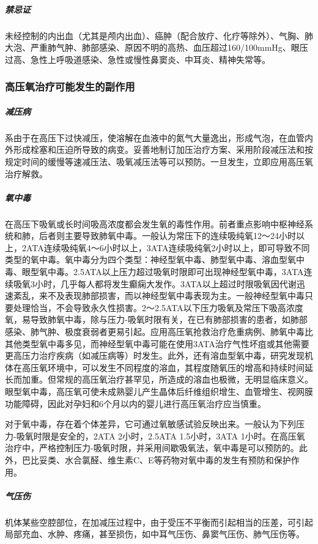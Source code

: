 \subparagraph{禁忌证}

未经控制的内出血（尤其是颅内出血）、癌肿（配合放疗、化疗等除外）、气胸、肺大泡、严重肺气肿、肺部感染、原因不明的高热、血压超过160/100mmHg、眼压过高、急性上呼吸道感染、急性或慢性鼻窦炎、中耳炎、精神失常等。

\subsubsection{高压氧治疗可能发生的副作用}

\subparagraph{减压病}

系由于在高压下过快减压，使溶解在血液中的氮气大量逸出，形成气泡，在血管内外形成栓塞和压迫所导致的病变。妥善地制订加压治疗方案、采用阶段减压法和按规定时间的缓慢等速减压法、吸氧减压法等可以预防。一旦发生，立即应用高压氧治疗解救。

\subparagraph{氧中毒}

在高压下吸氧或长时间吸高浓度都会发生氧的毒性作用。前者重点影响中枢神经系统和肺，后者则主要导致肺氧中毒。一般认为常压下的连续吸纯氧12～24小时以上，2ATA连续吸纯氧4～6小时以上，3ATA连续吸纯氧2小时以上，即可导致不同类型的氧中毒。氧中毒分为四个类型：神经型氧中毒、肺型氧中毒、溶血型氧中毒、眼型氧中毒。2.5ATA以上压力超过吸氧时限即可出现神经型氧中毒，3ATA连续吸氧3小时，几乎每人都将发生癫痫大发作。3ATA以上超过时限吸氧因代谢迅速紊乱，来不及表现肺部损害，而以神经型氧中毒表现为主。一般神经型氧中毒只要处理恰当，不会导致永久性损害。2～2.5ATA以下压力吸氧及常压下吸高浓度氧，易导致肺氧中毒，除与压力-吸氧时限有关，在已有肺部损害的患者，如肺部感染、肺气肿、极度衰弱者更易引起。应用高压氧抢救治疗危重病例、肺氧中毒比其他类型氧中毒多见，而神经型氧中毒可能在使用3ATA治疗气性坏疽或其他需要更高压力治疗疾病（如减压病等）时发生。此外，还有溶血型氧中毒，研究发现机体在高压氧环境中，可以发生不同程度的溶血，其程度随氧压的增高和持续时间延长而加重。但常规的高压氧治疗甚罕见，所造成的溶血也极微，无明显临床意义。眼型氧中毒，高压氧可使未成熟婴儿产生晶体后纤维组织增生、血管增生、视网膜功能障碍，因此对孕妇和6个月以内的婴儿进行高压氧治疗应当慎重。

对于氧中毒，存在着个体差异，它可通过氧敏感试验反映出来。一般认为下列压力-吸氧时限是安全的，2ATA
2小时，2.5ATA 1.5小时，3ATA
1小时。在高压氧治疗中，严格控制压力-吸氧时限，并采用间歇吸氧法，氧中毒是可以预防的。此外，巴比妥类、水合氯醛、维生素C、E等药物对氧中毒的发生有预防和保护作用。

\subparagraph{气压伤}

机体某些空腔部位，在加减压过程中，由于受压不平衡而引起相当的压差，可引起局部充血、水肿、疼痛，甚至损伤，如中耳气压伤、鼻窦气压伤、肺气压伤等。

